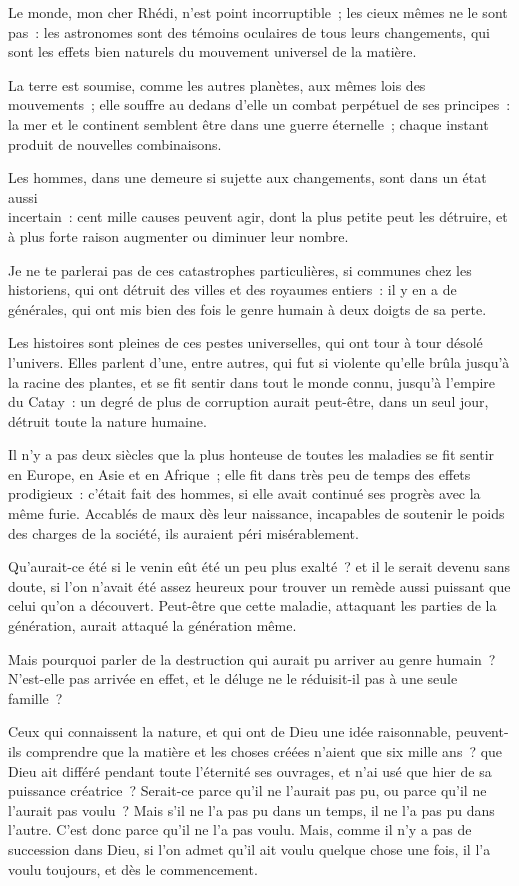 \documentclass[french,twoside]{book} %
\begin{document}
\noindent Le monde, mon cher Rhédi, n’est point incorruptible ; les cieux mêmes ne le sont pas : les astronomes sont des témoins oculaires de tous leurs changements, qui sont les effets bien naturels du mouvement universel de la matière.\par
La terre est soumise, comme les autres planètes, aux mêmes lois des mouvements ; elle souffre au dedans d’elle un combat perpétuel de ses principes : la mer et le continent semblent être dans une guerre éternelle ; chaque instant produit de nouvelles combinaisons.\par
Les hommes, dans une demeure si sujette aux changements, sont dans un état aussi \\
incertain : cent mille causes peuvent agir, dont la plus petite peut les détruire, et à plus forte raison augmenter ou diminuer leur nombre.\par
Je ne te parlerai pas de ces catastrophes particulières, si communes chez les historiens, qui ont détruit des villes et des royaumes entiers : il y en a de générales, qui ont mis bien des fois le genre humain à deux doigts de sa perte.\par
Les histoires sont pleines de ces pestes universelles, qui ont tour à tour désolé l’univers. Elles parlent d’une, entre autres, qui fut si violente qu’elle brûla jusqu’à la racine des plantes, et se fit sentir dans tout le monde connu, jusqu’à l’empire du Catay : un degré de plus de corruption aurait peut-être, dans un seul jour, détruit toute la nature humaine.\par
Il n’y a pas deux siècles que la plus honteuse de toutes les maladies se fit sentir en Europe, en Asie et en Afrique ; elle fit dans très peu de temps des effets prodigieux : c’était fait des hommes, si elle avait continué ses progrès avec la même furie. Accablés de maux dès leur naissance, incapables de soutenir le poids des charges de la société, ils auraient péri misérablement.\par
Qu’aurait-ce été si le venin eût été un peu plus exalté ? et il le serait devenu sans doute, si l’on n’avait été assez heureux pour trouver un remède aussi puissant que celui qu’on a découvert. Peut-être que cette maladie, attaquant les parties de la génération, aurait attaqué la génération même.\par
Mais pourquoi parler de la destruction qui aurait pu arriver au genre humain ? N’est-elle pas arrivée en effet, et le déluge ne le réduisit-il pas à une seule famille ?\par
Ceux qui connaissent la nature, et qui ont de Dieu une idée raisonnable, peuvent-ils comprendre que la matière et les choses créées n’aient que six mille ans ? que Dieu ait différé pendant toute l’éternité ses ouvrages, et n’ai usé que hier de sa puissance créatrice ? Serait-ce parce qu’il ne l’aurait pas pu, ou parce qu’il ne l’aurait pas voulu ? Mais s’il ne l’a pas pu dans un temps, il ne l’a pas pu dans l’autre. C’est donc parce qu’il ne l’a pas voulu. Mais, comme il n’y a pas de succession dans Dieu, si l’on admet qu’il ait voulu quelque chose une fois, il l’a voulu toujours, et dès le commencement.\par
\end{document}
